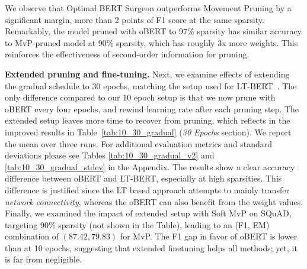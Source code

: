 \documentclass[11pt]{article}
\begin{document}
We observe that Optimal BERT Surgeon outperforms Movement Pruning by a significant margin, more than 2 points of F1 score at the same sparsity. Remarkably, the model pruned with oBERT to 97\% sparsity has similar accuracy to MvP-pruned model at 90\% sparsity, which has roughly 3x more weights. This reinforces the effectiveness of second-order information for pruning.

\noindent\textbf{Extended pruning and fine-tuning.} 
Next, we examine effects of extending the gradual schedule to 30 epochs, matching the setup used for LT-BERT~\cite{Chen2020TheLT}. The only difference compared to our 10 epoch setup is that we now prune with oBERT every four epochs, and rewind learning rate after each pruning step. The extended setup leaves more time to recover from pruning, which reflects in the improved results in Table~\ref{tab:10_30_gradual} (\textit{30 Epochs} section). We report the mean over three runs. For additional evaluation metrics and standard deviations please see Tables \ref{tab:10_30_gradual_v2} and \ref{tab:10_30_gradual_stdev} in the Appendix. The results show a clear accuracy difference between oBERT and LT-BERT, especially at high sparsities. This difference is justified since the LT based approach attempts to mainly transfer \emph{network connectivity}, whereas the oBERT can also benefit from the weight values. Finally, we examined the impact of extended setup with Soft MvP on SQuAD, targeting 90\% sparsity (not shown in the Table), leading to an (F1, EM) combination of $(87.42, 79.83)$ for MvP. The F1 gap in favor of oBERT is lower than at 10 epochs, suggesting that extended finetuning helps all methods; yet, it is far from negligible.
\end{document}
